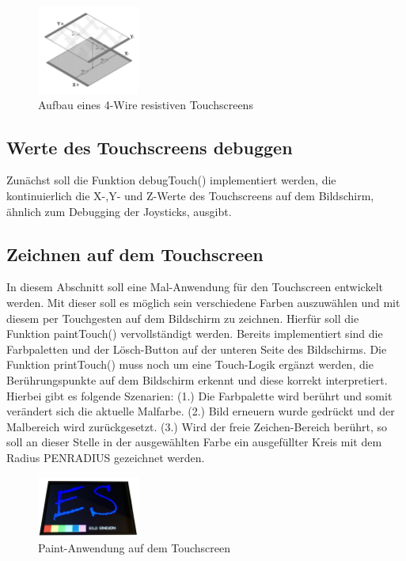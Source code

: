 \begin{figure}[htbp]
	\centering
	\includegraphics[width=0.3\textwidth]{./05_c/figures/ResistiveTS.png}
	\caption{Aufbau eines 4-Wire resistiven Touchscreens }
	\label{img:fourRSTouch}
\end{figure} 

\subsection{Werte des Touchscreens debuggen}
Zunächst soll die Funktion debugTouch() implementiert werden, die kontinuierlich die X-,Y- und Z-Werte des Touchscreens auf dem Bildschirm, ähnlich zum Debugging der Joysticks, ausgibt.

\subsection{Zeichnen auf dem Touchscreen}
In diesem Abschnitt soll eine Mal-Anwendung für den Touchscreen entwickelt werden. Mit dieser soll es möglich sein verschiedene Farben auszuwählen und mit diesem per Touchgesten auf dem Bildschirm zu zeichnen. Hierfür soll die Funktion paintTouch() vervollständigt werden. Bereits implementiert sind die Farbpaletten und der Lösch-Button auf der unteren Seite des Bildschirms. Die Funktion printTouch() muss noch um eine Touch-Logik ergänzt werden, die Berührungspunkte auf dem Bildschirm erkennt und diese korrekt interpretiert. Hierbei gibt es folgende Szenarien: 
(1.) Die Farbpalette wird berührt und somit verändert sich die aktuelle Malfarbe.
(2.) Bild erneuern wurde gedrückt und der Malbereich wird zurückgesetzt.
(3.) Wird der freie Zeichen-Bereich berührt, so soll an dieser Stelle in der ausgewählten Farbe ein ausgefüllter Kreis mit dem Radius PENRADIUS gezeichnet werden.
\begin{figure}[htbp]
	\centering
	\includegraphics[width=0.3\textwidth]{./05_c/figures/Paint-Szenario.png}
	\caption{Paint-Anwendung auf dem Touchscreen}
	\label{img:paintTouch}
\end{figure} 
